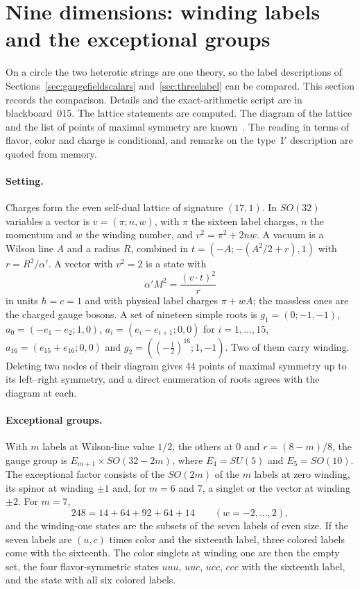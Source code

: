 \section{Nine dimensions: winding labels and the exceptional groups}
\label{sec:ninedim}
On a circle the two heterotic strings are one theory, so the label
descriptions of Sections~\ref{sec:gaugefieldscalars}
and~\ref{sec:threelabel} can be compared. This section records the
comparison. Details and the exact-arithmetic script are in
blackboard~015. The lattice statements are computed. The diagram of the
lattice and the list of points of maximal symmetry are
known~\cite{FFGNP}. The reading in terms of flavor, color and charge is
conditional, and remarks on the type~I$'$ description are quoted from
memory.

\paragraph{Setting.}
Charges form the even self-dual lattice of signature $(17,1)$. In
$SO(32)$ variables a vector is $v=(\pi;n,w)$, with $\pi$ the sixteen
label charges, $n$ the momentum and $w$ the winding number, and
$v^2=\pi^2+2nw$. A vacuum is a Wilson line $A$ and a radius $R$,
combined in $t=(-A;-(A^2/2+r),1)$ with $r=R^2/\alpha'$. A vector with
$v^2=2$ is a state with
\begin{equation}
\alpha' M^2=\frac{(v\cdot t)^2}{r}
\label{eq:ninedmass}
\end{equation}
in units $\hbar=c=1$ and with physical label charges $\pi+wA$; the
massless ones are the charged gauge bosons. A set of nineteen simple
roots is $g_1=(0;-1,-1)$, $a_0=(-e_1-e_2;1,0)$,
$a_i=(e_i-e_{i+1};0,0)$ for $i=1,\dots,15$,
$a_{16}=(e_{15}+e_{16};0,0)$ and $g_2=((-\tfrac12)^{16};1,-1)$. Two of
them carry winding. Deleting two nodes of their diagram gives 44 points
of maximal symmetry up to its left--right symmetry, and a direct
enumeration of roots agrees with the diagram at each.

\paragraph{Exceptional groups.}
With $m$ labels at Wilson-line value $1/2$, the others at $0$ and
$r=(8-m)/8$, the gauge group is $E_{m+1}\times SO(32-2m)$, where
$E_4=SU(5)$ and $E_5=SO(10)$. The exceptional factor consists of the
$SO(2m)$ of the $m$ labels at zero winding, its spinor at winding
$\pm1$ and, for $m=6$ and $7$, a singlet or the vector at winding
$\pm2$. For $m=7$,
\begin{equation}
248=14+64+92+64+14\qquad(w=-2,\dots,2),
\end{equation}
and the winding-one states are the subsets of the seven labels of even
size. If the seven labels are $(u,c)$ times color and the sixteenth
label, three colored labels come with the sixteenth. The color singlets
at winding one are then the empty set, the four flavor-symmetric states
$uuu$, $uuc$, $ucc$, $ccc$ with the sixteenth label, and the state with
all six colored labels.

